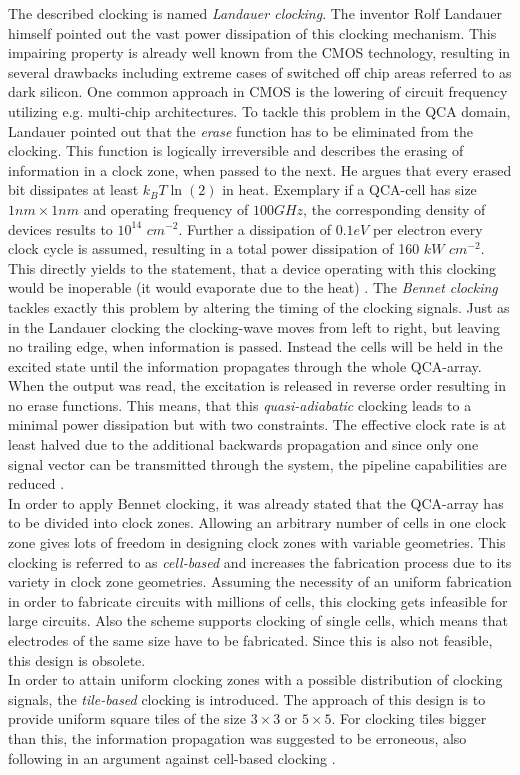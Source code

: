 The described clocking is named \textit{Landauer clocking}. The inventor Rolf Landauer himself pointed out the vast power dissipation of this clocking mechanism. This impairing property is already well known from the CMOS technology, resulting in several drawbacks including extreme cases of switched off chip areas referred to as dark silicon. One common approach in CMOS is the lowering of circuit frequency utilizing e.g. multi-chip architectures. To tackle this problem in the QCA domain, Landauer pointed out that the \textit{erase} function has to be eliminated from the clocking. This function is logically irreversible and describes the erasing of information in a clock zone, when passed to the next. He argues that every erased bit dissipates at least $k_BT\ln(2)$ in heat. Exemplary if a QCA-cell has size $1nm \times 1nm$ and operating frequency of $100 GHz$, the corresponding density of devices results to $10^{14}$ $cm^{-2}$. Further a dissipation of $0.1 eV$ per electron every clock cycle is assumed, resulting in a total power dissipation of 160 $kW$ $cm^{-2}$. This directly yields to the statement, that a device operating with this clocking would be inoperable (it would evaporate due to the heat) \cite{lent2006bennett}. The \textit{Bennet clocking} tackles exactly this problem by altering the timing of the clocking signals. Just as in the Landauer clocking the clocking-wave moves from left to right, but leaving no trailing edge, when information is passed. Instead the cells will be held in the excited state until the information propagates through the whole QCA-array. When the output was read, the excitation is released in reverse order resulting in no erase functions. This means, that this \textit{quasi-adiabatic} clocking leads to a minimal power dissipation but with two constraints. The effective clock rate is at least halved due to the additional backwards propagation and since only one signal vector can be transmitted through the system, the pipeline capabilities are reduced \cite{lent2006bennett}.\\
In order to apply Bennet clocking, it was already stated that the QCA-array has to be divided into clock zones. Allowing an arbitrary number of cells in one clock zone gives lots of freedom in designing clock zones with variable geometries. This clocking is referred to as \textit{cell-based} and increases the fabrication process due to its variety in clock zone geometries. Assuming the necessity of an uniform fabrication in order to fabricate circuits with millions of cells, this clocking gets infeasible for large circuits. Also the scheme supports clocking of single cells, which means that electrodes of the same size have to be fabricated. Since this is also not feasible, this design is obsolete.\\ 
In order to attain uniform clocking zones with a possible distribution of clocking signals, the \textit{tile-based} clocking is introduced. The approach of this design is to provide uniform square tiles of the size $3 \times 3$ or $5 \times 5$. For clocking tiles bigger than this, the information propagation was suggested to be erroneous, also following in an argument against cell-based clocking \cite{taucer2015consequences}.


